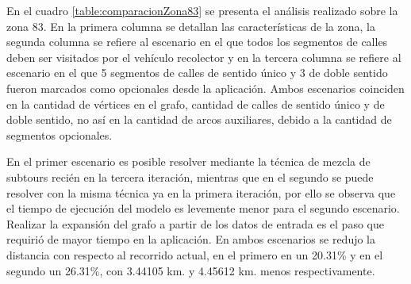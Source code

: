 En el cuadro \ref{table:comparacionZona83} se presenta el análisis realizado sobre la zona 83.  En la primera columna se detallan las características de la zona, la segunda columna se refiere al escenario en el que todos los segmentos de calles deben ser visitados por el vehículo recolector y en la tercera columna se refiere al escenario en el que 5 segmentos de calles de sentido único y 3 de doble sentido fueron marcados como opcionales desde la aplicación. Ambos escenarios coinciden en la cantidad de vértices en el grafo, cantidad de calles de sentido único y de doble sentido, no así en la cantidad de arcos auxiliares, debido a la cantidad de segmentos opcionales. 

En el primer escenario es posible resolver mediante la técnica de mezcla de subtours recién en la tercera iteración, mientras que en el segundo se puede resolver con la misma técnica ya en la primera iteración, por ello se observa que el tiempo de ejecución del modelo es levemente menor para el segundo escenario. Realizar la expansión del grafo a partir de los datos de entrada es el paso que requirió de mayor tiempo en la aplicación. En ambos escenarios se redujo la distancia con respecto al recorrido actual, en el primero en un 20.31\%  y en el segundo un 26.31\%, con 3.44105 km. y 4.45612 km. menos respectivamente.

